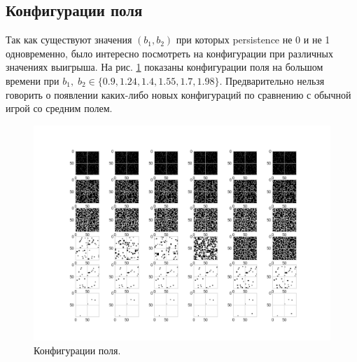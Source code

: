 \documentclass[12pt]{article}
\begin{document}
    \subsection{Конфигурации поля}
    Так как существуют значения $(b_1, b_2)$ при которых persistence не 0 и не 1 одновременно, было интересно посмотреть на конфигурации при различных значениях выигрыша. На рис. \ref{fig:Dfields} показаны конфигурации поля на большом времени при $b_1,\;b_2\in\{0.9, 1.24, 1.4, 1.55, 1.7, 1.98\}$. Предварительно нельзя говорить о появлении каких-либо новых конфигураций по сравнению с обычной игрой со средним полем.
    \begin{figure}[H]
         \centering
         \includegraphics[width=0.95\columnwidth, keepaspectratio=True]{DoubleField/differentconfigs.png}
         \caption{Конфигурации поля.}
         \label{fig:Dfields}
    \end{figure}
    
\end{document}
